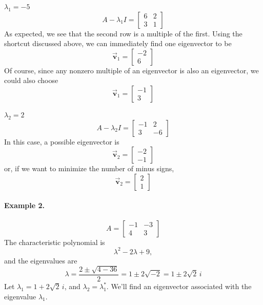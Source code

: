 \documentclass[reqno]{immbook}
\newcommand{\BV}{\vec{\textbf{v}}}
\begin{document}
\medskip
\noindent
\underline{$\lambda_1 = -5$}
\[
   A-\lambda_1 I = \begin{bmatrix}
                   6 & 2 \\ 3 & 1
                   \end{bmatrix}
\]
As expected, we see that the second row
is a multiple of the first. Using the shortcut discussed
above, we can immediately find one eigenvector to be
\[
   \BV_1 = \begin{bmatrix} -2 \\ 6 \end{bmatrix}
\]
Of course, since any nonzero multiple of an eigenvector
is also an eigenvector, we could also choose
\[
   \BV_1 = \begin{bmatrix} -1 \\ 3 \end{bmatrix}
\]

\medskip
\noindent
\underline{$\lambda_2 = 2$}
\[
  A - \lambda_2 I = \begin{bmatrix}
                      -1 & 2 \\ 3 & -6
                    \end{bmatrix}
\]
In this case, a possible eigenvector is
\[
  \BV_2 = \begin{bmatrix} -2 \\ -1 \end{bmatrix}
\]
or, if we want to minimize the number of minus signs,
\[
  \BV_2 = \begin{bmatrix} 2 \\ 1 \end{bmatrix}
\]

\paragraph{Example 2.}
\[
   A = \begin{bmatrix} -1 & -3 \\ 4 & 3 \end{bmatrix}
\]
The characteristic polynomial is
\[
  \lambda^2 - 2\lambda + 9,
\]
and the eigenvalues are
\[
  \lambda = \frac{2\pm \sqrt{4-36}}{2} = 1\pm 2\sqrt{-2}
    = 1 \pm 2 \sqrt{2} \, i
\]
Let $\lambda_1 = 1 + 2\sqrt{2}\, i$, and $\lambda_2 = \lambda_1^{*}$.
We'll find an eigenvector associated with
the eigenvalue $\lambda_1$.
\end{document}
